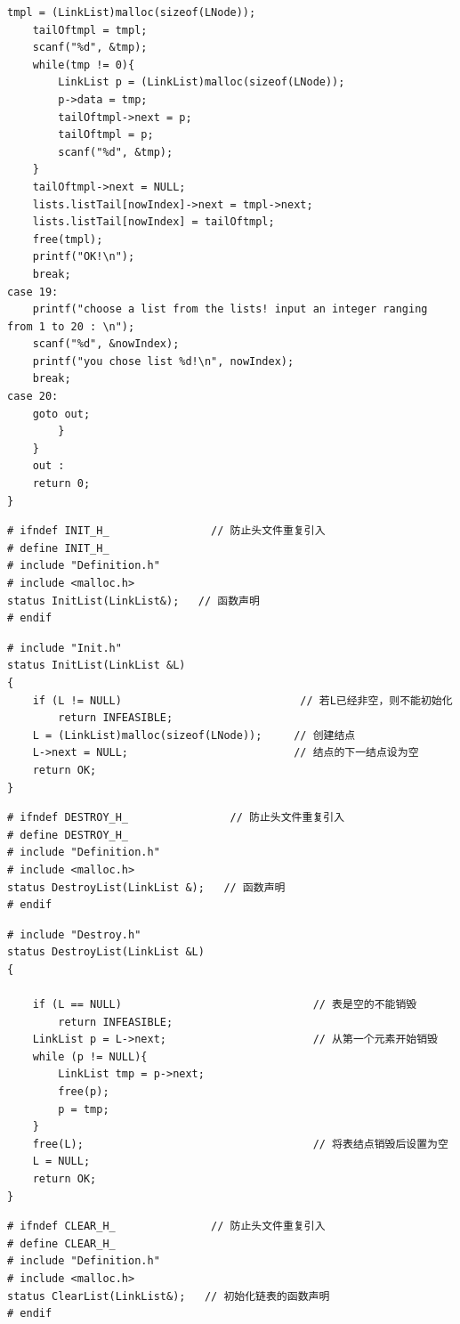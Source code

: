 \documentclass[supercite]{Experimental_Report}
\theoremstyle{definition}
\begin{document}
\begin{lstlisting}[title = Main.cpp]
	tmpl = (LinkList)malloc(sizeof(LNode));
	tailOftmpl = tmpl;
	scanf("%d", &tmp);
	while(tmp != 0){
		LinkList p = (LinkList)malloc(sizeof(LNode));
		p->data = tmp;
		tailOftmpl->next = p;
		tailOftmpl = p;
		scanf("%d", &tmp);
	}
	tailOftmpl->next = NULL;
	lists.listTail[nowIndex]->next = tmpl->next;
	lists.listTail[nowIndex] = tailOftmpl;
	free(tmpl);
	printf("OK!\n");
	break;
case 19:
	printf("choose a list from the lists! input an integer ranging from 1 to 20 : \n");
	scanf("%d", &nowIndex);
	printf("you chose list %d!\n", nowIndex);
	break;
case 20:
	goto out;
		}     
	}
	out :
	return 0;
}	
\end{lstlisting}

\begin{lstlisting}[title = Init.h]
# ifndef INIT_H_                // 防止头文件重复引入
# define INIT_H_
# include "Definition.h"
# include <malloc.h>
status InitList(LinkList&);   // 函数声明
# endif
\end{lstlisting}

\begin{lstlisting}[title = Init.cpp]
# include "Init.h"
status InitList(LinkList &L)
{
    if (L != NULL)                            // 若L已经非空，则不能初始化
        return INFEASIBLE;
    L = (LinkList)malloc(sizeof(LNode));     // 创建结点
    L->next = NULL;                          // 结点的下一结点设为空
    return OK;
}
\end{lstlisting}

\begin{lstlisting}[title = Destroy.h]
# ifndef DESTROY_H_                // 防止头文件重复引入
# define DESTROY_H_
# include "Definition.h"
# include <malloc.h>
status DestroyList(LinkList &);   // 函数声明
# endif
\end{lstlisting}

\begin{lstlisting}[title = Destroy.cpp]
# include "Destroy.h"
status DestroyList(LinkList &L)
{

    if (L == NULL)                              // 表是空的不能销毁
        return INFEASIBLE;
    LinkList p = L->next;                       // 从第一个元素开始销毁
    while (p != NULL){
        LinkList tmp = p->next;
        free(p);
        p = tmp;
    }
    free(L);                                    // 将表结点销毁后设置为空
    L = NULL;
    return OK;
}
\end{lstlisting}

\begin{lstlisting}[title = Clear.h]
# ifndef CLEAR_H_               // 防止头文件重复引入
# define CLEAR_H_
# include "Definition.h"
# include <malloc.h>
status ClearList(LinkList&);   // 初始化链表的函数声明
# endif
\end{lstlisting}
\end{document}
